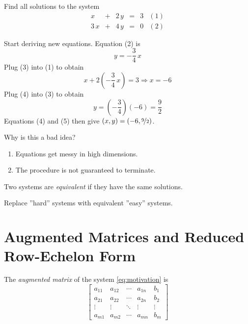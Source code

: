 \documentclass[12pt]{article}
\begin{document}
\begin{samepage}
  \begin{ex}
    Find all solutions to the system
    \[
    \begin{array}{rcrcrr}
      x    & + & 2\,y & = & 3 & (1) \\
      3\,x & + & 4\,y & = & 0 & (2)
    \end{array}
    \]
  \end{ex}
  \begin{badidea}
    Start deriving new equations. Equation (2) is
    \[
    y=-\frac{3}{4}\,x\tag{3}
    \]
    Plug (3) into (1) to obtain
    \[
    x+2\left(-\frac{3}{4}\,x\right)=3\Rightarrow x=-6\tag{4}
    \]
    Plug (4) into (3) to obtain
    \[
    y=\left(-\frac{3}{4}\right)(-6)=\frac{9}{2}\tag{5}
    \]
    Equations (4) and (5) then give $(x,y)=\left(-6,\nicefrac{9}{2}\right)$.
  \end{badidea}
\end{samepage}


\begin{samepage}
  \begin{question}
    Why is this a bad idea?
  \end{question}
  \begin{enumerate}
  \item Equations get messy in high dimensions.
  \item The procedure is not guaranteed to terminate.
  \end{enumerate}

  \begin{definition}
    Two systems are \emph{equivalent} if they have the same solutions.
  \end{definition}

  \begin{goodidea}
    Replace ''hard'' systems with equivalent ''easy'' systems.
  \end{goodidea}
\end{samepage}

\pagebreak
\section{Augmented Matrices and Reduced Row-Echelon Form}

\begin{definition}
  The \emph{augmented matrix} of the system \eqref{eq:motivation} is
  \[
  \left[
    \begin{array}{rrcr|r}
      a_{11} & a_{12} & \dotsb & a_{1n} & b_{1} \\
      a_{21} & a_{22} & \dotsb & a_{2n} & b_{2} \\
      \vdots & \vdots & \ddots & \vdots & \vdots \\
      a_{m1} & a_{m2} & \dotsb & a_{mn} & b_{m}
    \end{array}
  \right]
  \]
\end{definition}
\end{document}
